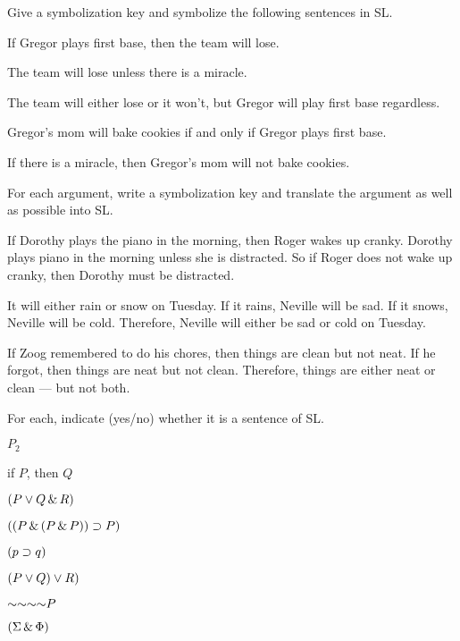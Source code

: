 {\solutions
\problempart
\label{pr.gregorbaseball}
Give a symbolization key and symbolize the following sentences in SL.
\begin{earg}
\item If Gregor plays first base, then the team will lose.
\item The team will lose unless there is a miracle.
\item The team will either lose or it won't, but Gregor will play first base regardless.
\item Gregor's mom will bake cookies if and only if Gregor plays first base.
\item If there is a miracle, then Gregor's mom will not bake cookies.
\end{earg}


\problempart
\label{pr.choresSL}
For each argument, write a symbolization key and translate the argument as well as possible into SL.
\begin{earg}
\item If Dorothy plays the piano in the morning, then Roger wakes up cranky. Dorothy plays piano in the morning unless she is distracted. So if Roger does not wake up cranky, then Dorothy must be distracted.
\item It will either rain or snow on Tuesday. If it rains, Neville will be sad. If it snows, Neville will be cold. Therefore, Neville will either be sad or cold on Tuesday.
\item If Zoog remembered to do his chores, then things are clean but not neat. If he forgot, then things are neat but not clean. Therefore, things are either neat or clean --- but not both.
\end{earg}



\problempart
\label{HW2.A}
For each, indicate (yes/no) whether it is a sentence of SL.
\begin{earg}
		\item $P_{2}$
		\item if $P$, then $Q$
		\item $(P \vee Q \,\&\, R)$
		\item $((P \,\&\, (P \,\&\, P)) \supset P)$
		\item $(p \supset q)$
		\item $(P \vee Q) \vee R)$
		\item $\enot \enot \enot \enot P$
		\item $(\Sigma \,\&\, \Phi)$
	\end{earg}

}
